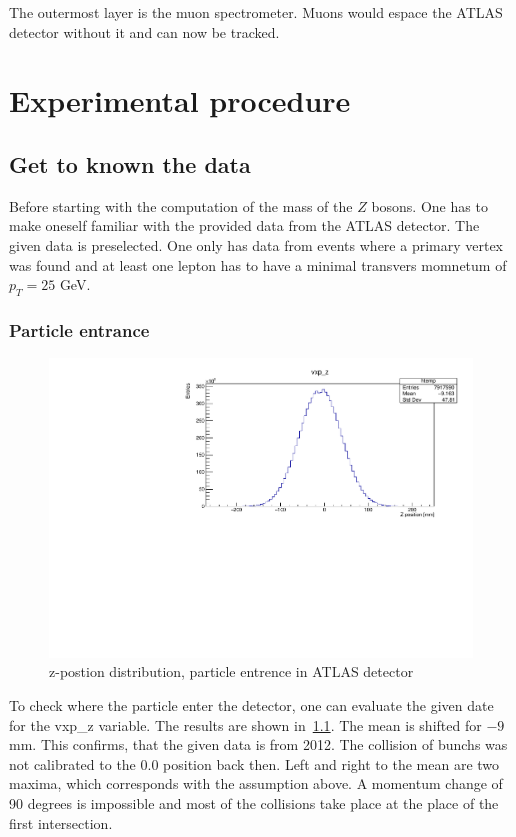 \documentclass[12pt, a4paper, bibliography=totoc]{scrreprt}
\begin{document}
The outermost layer is the muon spectrometer. Muons would espace the ATLAS detector without it and can now be tracked. 


\chapter{Experimental procedure}

\section{Get to known the data}
Before starting with the computation of the mass of the $Z$ bosons. One has to make oneself familiar with the provided data from the ATLAS detector. The given data is preselected. One only has data from events where a primary vertex was found and at least one lepton has to have a minimal transvers momnetum of $p_{T} = 25$ GeV.

\subsection{Particle entrance}
\begin{figure}
	\centering
	\includegraphics[scale=0.5]{fig/vxp_z_redo.pdf}
	\caption{z-postion distribution, particle entrence in ATLAS detector}
	\label{vxp_z}
\end{figure}
To check where the particle enter the detector, one can evaluate the given date for the vxp\_z variable. The results are shown in~\ref{vxp_z}. The mean is shifted for $-9$ mm. This confirms, that the given data is from 2012. The collision of bunchs was not calibrated to the $0.0$ position back then.
Left and right to the mean are two maxima, which corresponds with the assumption above. A momentum change of 90 degrees is impossible and most of the collisions take place at the place of the first intersection.
\end{document}
